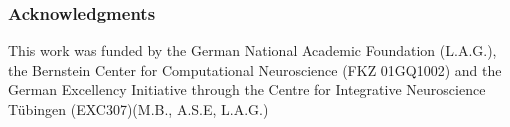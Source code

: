 \documentclass{article} %
\begin{document}







\subsubsection*{Acknowledgments}
This work was funded by the German National Academic Foundation (L.A.G.), the Bernstein Center for Computational Neuroscience (FKZ 01GQ1002) and the German Excellency Initiative through the Centre for Integrative Neuroscience T\"ubingen (EXC307)(M.B., A.S.E, L.A.G.)
\small{

}
\end{document}
